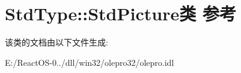 \hypertarget{class_std_type_1_1_std_picture}{}\section{Std\+Type\+:\+:Std\+Picture类 参考}
\label{class_std_type_1_1_std_picture}


该类的文档由以下文件生成\+:\begin{DoxyCompactItemize}
\item 
E\+:/\+React\+O\+S-\/0../dll/win32/olepro32/olepro.\+idl\end{DoxyCompactItemize}
